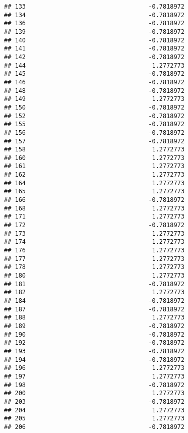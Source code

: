 \documentclass[
]{article}
\begin{document}
\begin{verbatim}
## 133                                  -0.7818972
## 134                                  -0.7818972
## 136                                  -0.7818972
## 139                                  -0.7818972
## 140                                  -0.7818972
## 141                                  -0.7818972
## 142                                  -0.7818972
## 144                                   1.2772773
## 145                                  -0.7818972
## 146                                  -0.7818972
## 148                                  -0.7818972
## 149                                   1.2772773
## 150                                  -0.7818972
## 152                                  -0.7818972
## 155                                  -0.7818972
## 156                                  -0.7818972
## 157                                  -0.7818972
## 158                                   1.2772773
## 160                                   1.2772773
## 161                                   1.2772773
## 162                                   1.2772773
## 164                                   1.2772773
## 165                                   1.2772773
## 166                                  -0.7818972
## 168                                   1.2772773
## 171                                   1.2772773
## 172                                  -0.7818972
## 173                                   1.2772773
## 174                                   1.2772773
## 176                                   1.2772773
## 177                                   1.2772773
## 178                                   1.2772773
## 180                                   1.2772773
## 181                                  -0.7818972
## 182                                   1.2772773
## 184                                  -0.7818972
## 187                                  -0.7818972
## 188                                   1.2772773
## 189                                  -0.7818972
## 190                                  -0.7818972
## 192                                  -0.7818972
## 193                                  -0.7818972
## 194                                  -0.7818972
## 196                                   1.2772773
## 197                                   1.2772773
## 198                                  -0.7818972
## 200                                   1.2772773
## 203                                  -0.7818972
## 204                                   1.2772773
## 205                                   1.2772773
## 206                                  -0.7818972

\end{verbatim}
\end{document}
